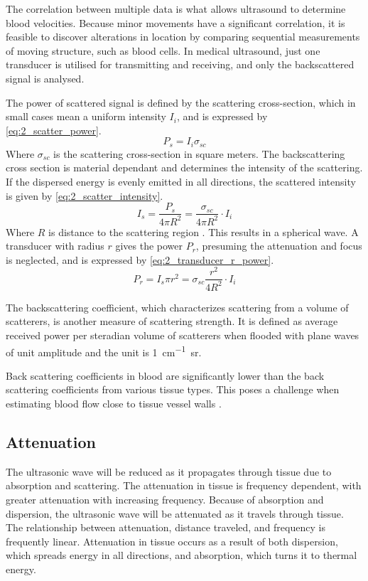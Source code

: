 The correlation between multiple data is what allows ultrasound to determine blood velocities.
Because minor movements have a significant correlation, it is feasible to discover alterations in location by comparing sequential measurements of moving structure, such as blood cells. In medical ultrasound, just one transducer is utilised for transmitting and receiving, and only the backscattered signal is analysed. 

The power of scattered signal is defined by the scattering cross-section, which in small cases mean a uniform intensity $I_{i}$, and is expressed by \cref{eq:2_scatter_power}.
\begin{equation} \label{eq:2_scatter_power}
	P_{s} = I_{i} \sigma_{s c}
\end{equation}
Where $\sigma_{s c}$ is the scattering cross-section in square meters. The backscattering cross section is material dependant and determines the intensity of the scattering. If the dispersed energy is evenly emitted in all directions, the scattered intensity is given by \cref {eq:2_scatter_intensity}.
\begin{equation} \label{eq:2_scatter_intensity}
	I_{s} = \frac{P_{s}}{4 \pi R^{2}} = \frac{\sigma_{sc}}{4 \pi R^{2}} \cdot I_{i}
\end{equation}
Where $R$ is distance to the scattering region \cite{JensenUltrasoundBook}. This results in a spherical wave. A transducer with radius $r$ gives the power $P_{r}$, presuming the attenuation and focus is neglected, and is expressed by \cref{eq:2_transducer_r_power}.
\begin{equation} \label{eq:2_transducer_r_power}
	P_{r} = I_{s} \pi r^{2} = \sigma_{s c} \frac{r^{2}}{4 R^{2}} \cdot I_{i}
\end{equation}

The backscattering coefficient, which characterizes scattering from a volume of scatterers, is another measure of scattering strength. It is defined as average received power per steradian volume of scatterers when flooded with plane waves of unit amplitude and the unit is \unit{1\per\centi\meter\steradian}.

Back scattering coefficients in blood are significantly lower than the back scattering coefficients from various tissue types. This poses a challenge when estimating blood flow close to tissue vessel walls \cite{ShungScattering1992,JensenUltrasoundBook}.

\subsection{Attenuation}
The ultrasonic wave will be reduced as it propagates through tissue due to absorption and scattering. The attenuation in tissue is frequency dependent, with greater attenuation with increasing frequency. Because of absorption and dispersion, the ultrasonic wave will be attenuated as it travels through tissue. The relationship between attenuation, distance traveled, and frequency is frequently linear. Attenuation in tissue occurs as a result of both dispersion, which spreads energy in all directions, and absorption, which turns it to thermal energy. 

